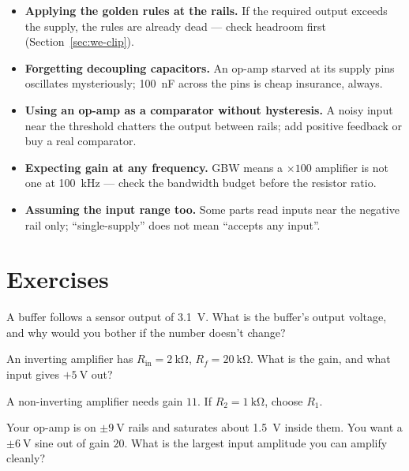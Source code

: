 \begin{itemize}
\item \textbf{Applying the golden rules at the rails.} If the required
output exceeds the supply, the rules are already dead — check headroom
first (Section~\ref{sec:we-clip}).
\item \textbf{Forgetting decoupling capacitors.} An op-amp starved at
its supply pins oscillates mysteriously; \qty{100}{\nano\farad} across
the pins is cheap insurance, always.
\item \textbf{Using an op-amp as a comparator without hysteresis.} A
noisy input near the threshold chatters the output between rails; add
positive feedback or buy a real comparator.
\item \textbf{Expecting gain at any frequency.} GBW means a
$\times100$ amplifier is not one at \qty{100}{\kilo\hertz} — check the
bandwidth budget before the resistor ratio.
\item \textbf{Assuming the input range too.} Some parts read inputs
near the negative rail only; ``single-supply'' does not mean
``accepts any input''.
\end{itemize}

\section{Exercises}
\label{sec:exercises07}

\begin{exercise}[easy]
A buffer follows a sensor output of \qty{3.1}{\volt}. What is the
buffer's output voltage, and why would you bother if the number doesn't
change?
\end{exercise}

\begin{exercise}[easy]
An inverting amplifier has $R_{\mathrm{in}} = \qty{2}{\kilo\ohm}$,
$R_f = \qty{20}{\kilo\ohm}$. What is the gain, and what input gives
$+\qty{5}{\volt}$ out?
\end{exercise}

\begin{exercise}[easy]
A non-inverting amplifier needs gain $11$. If $R_2 = \qty{1}{\kilo\ohm}$,
choose $R_1$.
\end{exercise}

\begin{exercise}[easy]
Your op-amp is on $\pm\qty{9}{\volt}$ rails and saturates about
\qty{1.5}{\volt} inside them. You want a $\pm\qty{6}{\volt}$ sine out of
gain $20$. What is the largest input amplitude you can amplify cleanly?
\end{exercise}

